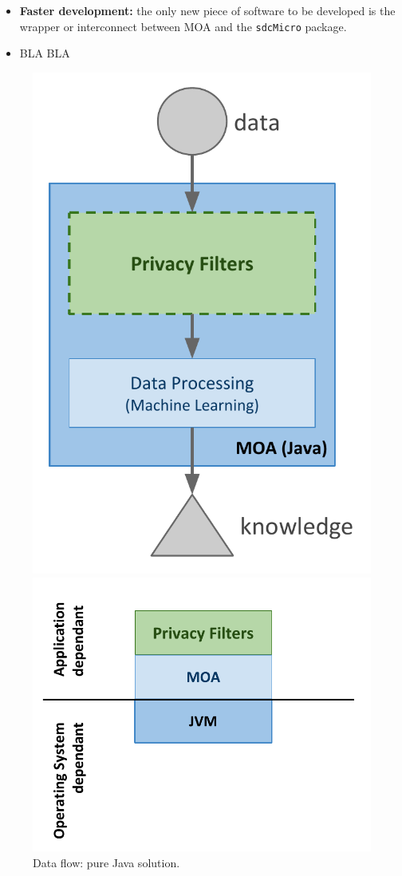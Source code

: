 \begin{itemize}
	\item \textbf{Faster development:} the only new piece of software to be developed is the wrapper or interconnect between MOA and the \texttt{sdcMicro} package.
	\item BLA BLA
\end{itemize}

\begin{figure}[h]
	\centering
	\begin{minipage}[t]{.45\textwidth}
		\centering
		\includegraphics[width=.7\textwidth]{figures/moa-ppsm-JAVA.pdf}
		\caption{Data flow: pure Java solution.}
		\label{fig:ppsm-JAVA}
	\end{minipage}\hfill
	\begin{minipage}[t]{.45\textwidth}
		\centering
		\includegraphics[width=1.0\textwidth]{figures/moa-ppsm-JAVA-arch.pdf}

\end{minipage}
\end{figure}
